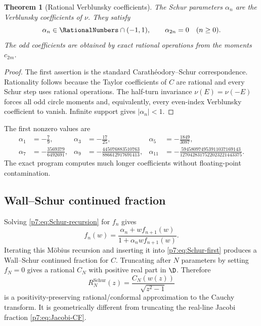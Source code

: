 \documentclass[11pt]{article}
\newtheorem{theorem}{Theorem}[section]
\theoremstyle{definition}
\theoremstyle{remark}
\begin{document}
\begin{theorem}[Rational Verblunsky coefficients]
\label{p7:thm:rational-alpha}
The Schur parameters \(\alpha_n\) are the Verblunsky coefficients of \(\nu\). They satisfy
\begin{equation}
 \alpha_n\in\RationalNumbers\cap(-1,1),\qquad \alpha_{2n}=0\quad(n\ge0).
 \label{p7:eq:alpha-rational-parity}
\end{equation}
The odd coefficients are obtained by exact rational operations from the moments \(c_{2m}\).
\end{theorem}

\begin{proof}
The first assertion is the standard Carath\'eodory--Schur correspondence. Rationality follows
because the Taylor coefficients of \(C\) are rational and every Schur step uses rational
operations. The half-turn invariance \(\nu(E)=\nu(-E)\) forces all odd circle moments and,
equivalently, every even-index Verblunsky coefficient to vanish. Infinite support gives
\(|\alpha_n|<1\).
\end{proof}

The first nonzero values are
\begin{align*}
 \alpha_1&=-\frac79,&
 \alpha_3&=-\frac{17}{25},&
 \alpha_5&=-\frac{1849}{3087},\\
 \alpha_7&=-\frac{3569379}{6492691},&
 \alpha_9&=-\frac{445076883510763}{886612917691413},&
 \alpha_{11}&=-\frac{594580974953911037169143}{1270428317522023221443375}.
\end{align*}
The exact program computes much longer coefficients without floating-point contamination.

\subsection{Wall--Schur continued fraction}

Solving \eqref{p7:eq:Schur-recursion} for \(f_n\) gives
\begin{equation}
 f_n(w)=\frac{\alpha_n+w f_{n+1}(w)}{1+\alpha_n w f_{n+1}(w)}.
 \label{p7:eq:inverse-Schur-step}
\end{equation}
Iterating this Möbius recursion and inserting it into \eqref{p7:eq:Schur-first} produces a
Wall--Schur continued fraction for \(C\). Truncating after \(N\) parameters by setting
\(f_N=0\) gives a rational \(C_N\) with positive real part in \(\D\). Therefore
\begin{equation}
 R_N^{\mathrm{Schur}}(z)=\frac{C_N(w(z))}{\sqrt{z^2-1}}
 \label{p7:eq:R-Schur-approximant}
\end{equation}
is a positivity-preserving rational/conformal approximation to the Cauchy transform. It is
geometrically different from truncating the real-line Jacobi fraction
\eqref{p7:eq:Jacobi-CF}.
\end{document}
